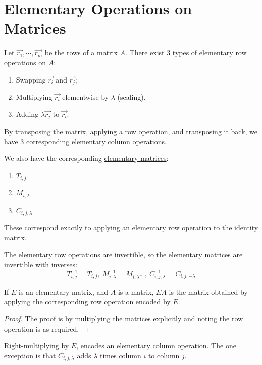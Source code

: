 \documentclass[../Main.tex]{subfiles}
\begin{document}
\section{Elementary Operations on Matrices}
Let $\vec{r_1}, \cdots, \vec{r_m}$ be the rows of a matrix $A$. There exist 3 types of \underline{elementary row} \underline{operations} on $A$:
\begin{enumerate}
    \item Swapping $\vec{r_i}$ and $\vec{r_j}$;
    \item Multiplying $\vec{r_i}$ elementwise by $\lambda$ (scaling).
    \item Adding $\lambda \vec{r_j}$ to $\vec{r_i}$.
\end{enumerate}
\begin{remark}
    By transposing the matrix, applying a row operation, and transposing it back, we have 3 corresponding \underline{elementary column operations}.
\end{remark}
We also have the corresponding \underline{elementary matrices}:
\begin{enumerate}
    \item $T_{i,j}$
    \item $M_{i, \lambda}$
    \item $C_{i, j, \lambda}$
\end{enumerate}
\begin{remarks}
    \item These correspond exactly to applying an elementary row operation to the identity matrix.
    \item The elementary row operations are invertible, so the elementary matrices are invertible with inverses:
    \begin{equation*}
        T_{i,j}^{-1} = T_{i,j},~M_{i, \lambda}^{-1} = M_{i, \lambda^{-1}},~C_{i, j, \lambda}^{-1} = C_{i, j, -\lambda}
    \end{equation*}
\end{remarks}
\begin{lemma}
    If $E$ is an elementary matrix, and $A$ is a matrix, $EA$ is the matrix obtained by applying the corresponding row operation encoded by $E$.
    \label{lemMatAndRowOP}
\end{lemma}
\begin{proof}
    The proof is by multiplying the matrices explicitly and noting the row operation is as required.
\end{proof}
\begin{remark}
    Right-multiplying by $E$, encodes an elementary column operation. The one exception is that $C_{i, j, \lambda}$ adds $\lambda$ times column $i$ to column $j$.
\end{remark}
\end{document}
